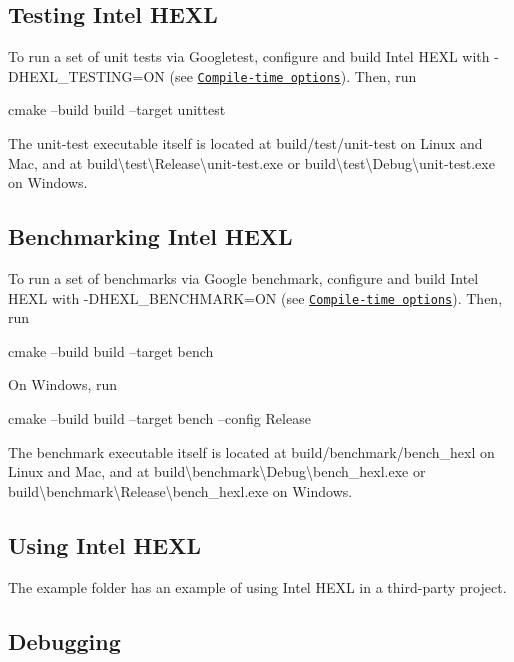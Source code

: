 \subsection*{Testing Intel H\+E\+XL}

To run a set of unit tests via Googletest, configure and build Intel H\+E\+XL with {\ttfamily -\/\+D\+H\+E\+X\+L\+\_\+\+T\+E\+S\+T\+I\+NG=ON} (see \href{#compile-time-options}{\tt Compile-\/time options}). Then, run 
\begin{DoxyCode}
cmake --build build --target unittest
\end{DoxyCode}
 The unit-\/test executable itself is located at {\ttfamily build/test/unit-\/test} on Linux and Mac, and at {\ttfamily build\textbackslash{}test\textbackslash{}Release\textbackslash{}unit-\/test.\+exe} or {\ttfamily build\textbackslash{}test\textbackslash{}Debug\textbackslash{}unit-\/test.\+exe} on Windows. \subsection*{Benchmarking Intel H\+E\+XL}

To run a set of benchmarks via Google benchmark, configure and build Intel H\+E\+XL with {\ttfamily -\/\+D\+H\+E\+X\+L\+\_\+\+B\+E\+N\+C\+H\+M\+A\+RK=ON} (see \href{#compile-time-options}{\tt Compile-\/time options}). Then, run 
\begin{DoxyCode}
cmake --build build --target bench
\end{DoxyCode}
 On Windows, run 
\begin{DoxyCode}
cmake --build build --target bench --config Release
\end{DoxyCode}


The benchmark executable itself is located at {\ttfamily build/benchmark/bench\+\_\+hexl} on Linux and Mac, and at {\ttfamily build\textbackslash{}benchmark\textbackslash{}Debug\textbackslash{}bench\+\_\+hexl.\+exe} or {\ttfamily build\textbackslash{}benchmark\textbackslash{}Release\textbackslash{}bench\+\_\+hexl.\+exe} on Windows.

\subsection*{Using Intel H\+E\+XL}

The {\ttfamily example} folder has an example of using Intel H\+E\+XL in a third-\/party project.

\subsection*{Debugging}

